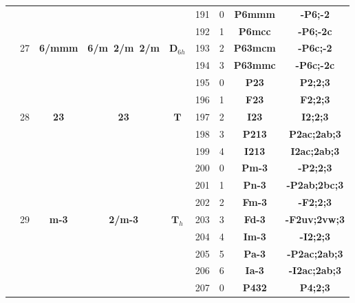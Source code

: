 \documentclass{article}      %
\begin{document}
\begin{small}
\begin{longtable}[c]{|c|c|c|c|c|c|c|c|c|}
          &  & & & &\textrm{191}  &\textrm{0} &\textbf{P6mmm}       &\textbf{-P6;-2}\\\cline{6-9}        
          &  & & & &\textrm{192}  &\textrm{1} &\textbf{P6mcc}       &\textbf{-P6;-2c}\\\cline{6-9}       
  & \textrm{27} &\textbf{6/mmm} &\textbf{6/m~2/m~2/m} &$\mathbf{D}_{6h}$  &\textrm{193}  &\textrm{2} &\textbf{P63mcm}     &\textbf{-P6c;-2}\\\cline{6-9}        
          &  & & & &\textrm{194}  &\textrm{3} &\textbf{P63mmc}     &\textbf{-P6c;-2c}\\\hline       
 & & & & &\textrm{195} &0 &\textbf{P23} &\textbf{P2;2;3} \\\cline{6-9}
 & & & & &\textrm{196} &1 &\textbf{F23} &\textbf{F2;2;3} \\\cline{6-9}
 & \textrm{28} &\textbf{23} &\textbf{23} &$\mathbf{T}$ &\textrm{197} &2 &\textbf{I23}&\textbf{I2;2;3} \\\cline{6-9}
 & & & & &\textrm{198} &3 &\textbf{P213} &\textbf{P2ac;2ab;3} \\\cline{6-9}
 & & & & &\textrm{199} &4 &\textbf{I213} &\textbf{I2ac;2ab;3} \\\cline{2-9}
 & & & & &\textrm{200} &0 &\textbf{Pm-3} &\textbf{-P2;2;3} \\\cline{6-9}
 & & & & &\textrm{201} &1 &\textbf{Pn-3} &\textbf{-P2ab;2bc;3} \\\cline{6-9}
 & & & & &\textrm{202} &2 &\textbf{Fm-3} &\textbf{-F2;2;3} \\\cline{6-9}
 & \textrm{29} &\textbf{m-3} &\textbf{2/m-3} &$\mathbf{T}_{h}$ &\textrm{203} &3 &\textbf{Fd-3}&\textbf{-F2uv;2vw;3} \\\cline{6-9}
 & & & & &\textrm{204} &4 &\textbf{Im-3} &\textbf{-I2;2;3} \\\cline{6-9}
 & & & & &\textrm{205} &5 &\textbf{Pa-3} &\textbf{-P2ac;2ab;3} \\\cline{6-9}
 & & & & &\textrm{206} &6 &\textbf{Ia-3} &\textbf{-I2ac;2ab;3} \\\cline{2-9}
 & & & & &\textrm{207} &0 &\textbf{P432} &\textbf{P4;2;3} \\\cline{6-9}

\end{longtable}
\end{small}
\end{document}
